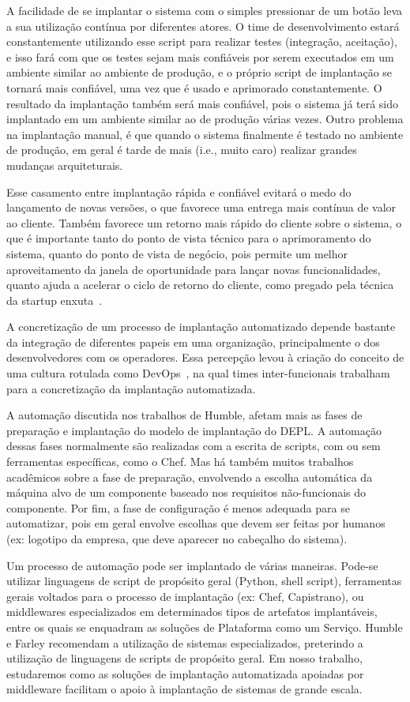 A facilidade de se implantar o sistema com o simples pressionar de um botão
leva a sua utilização contínua por diferentes atores.
O time de desenvolvimento estará constantemente utilizando esse script 
para realizar testes (integração, aceitação), e isso fará com que os testes sejam mais confiáveis
por serem executados em um ambiente similar ao ambiente de produção,
e o próprio script de implantação se tornará mais confiável,
uma vez que é usado e aprimorado constantemente.
O resultado da implantação também será mais confiável, pois o sistema
já terá sido implantado em um ambiente similar ao de produção várias vezes.
Outro problema na implantação manual, é que quando o sistema finalmente é testado
no ambiente de produção, em geral é tarde de mais (i.e., muito caro) 
realizar grandes mudanças arquiteturais.

Esse casamento entre implantação rápida e confiável evitará o medo do lançamento
de novas versões, o que favorece uma entrega mais contínua de valor ao cliente.
Também favorece um retorno mais rápido do cliente sobre o sistema,
o que é importante tanto do ponto de vista técnico para o aprimoramento do sistema,
quanto do ponto de vista de negócio, pois permite um melhor aproveitamento da janela de oportunidade
para lançar novas funcionalidades, quanto ajuda a acelerar o ciclo
de retorno do cliente, como pregado pela técnica da startup enxuta~\cite{Ries2011Lean}.

A concretização de um processo de implantação automatizado depende bastante da
integração de diferentes papeis em uma organização, principalmente o dos desenvolvedores
com os operadores. Essa percepção levou à criação do conceito de uma cultura 
rotulada como DevOps~\cite{Humble2011DevOps}, na qual times inter-funcionais
trabalham para a concretização da implantação automatizada.

A automação discutida nos trabalhos de Humble, afetam mais as fases de preparação e implantação do modelo de implantação do DEPL. A automação dessas fases normalmente são realizadas com a escrita de scripts, com ou sem ferramentas específicas, como o Chef. Mas há também muitos trabalhos acadêmicos sobre a fase de preparação, envolvendo a escolha automática da máquina alvo de um componente baseado nos requisitos não-funcionais do componente. Por fim, a fase de configuração é menos adequada para se automatizar, pois em geral envolve escolhas que devem ser feitas por humanos (ex: logotipo da empresa, que deve aparecer no cabeçalho do sistema).

Um processo de automação pode ser implantado de várias maneiras.
Pode-se utilizar linguagens de script de propósito geral (Python, shell script),
ferramentas gerais voltados para o processo de implantação (ex: Chef, Capistrano),
ou middlewares especializados em determinados tipos de artefatos implantáveis,
entre os quais se enquadram as soluções de Plataforma como um Serviço.
Humble e Farley recomendam a utilização de sistemas especializados, preterindo 
a utilização de linguagens de scripts de propósito geral.
Em nosso trabalho, estudaremos como as soluções de implantação automatizada
apoiadas por middleware facilitam o apoio à implantação de sistemas de grande escala.

